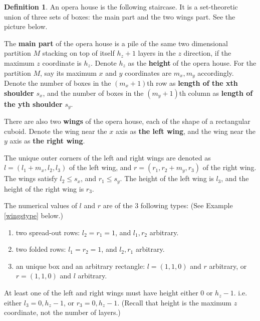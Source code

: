 \documentclass{amsart}[10pt]
\theoremstyle{plain}
\theoremstyle{definition}
\newtheorem{definition}[theorem]{Definition}
\begin{document}
\begin{definition}
\label{def_opera_house}
An opera house is the following staircase. It is a set-theoretic union of three sets of boxes: the main part and the two wings part. See the picture below.

The \textbf{main part} of the opera house is a pile of the same two dimensional partition $M$ stacking on top of itself $h_z+1$ layers in the $z$ direction, if the maximum $z$ coordinate is $h_z$. Denote $h_z$ as the \textbf{height} of the opera house. For the partition $M$, say its maximum $x$ and $y$ coordinates are $m_x, m_y$ accordingly. Denote the number of boxes in the $(m_x+1)$th row as \textbf{length of the  xth shoulder} $s_x$, and the number of boxes in the $(m_y+1)$th column as \textbf{length of the  yth shoulder} $s_y$.

There are also two \textbf{wings} of the opera house, each of the shape of a rectangular cuboid. Denote the wing near the $x$ axis as \textbf{the left wing}, and the wing near the $y$ axis as \textbf{the right wing}.

The unique outer corners of the left and right wings are denoted as $l=(l_1+ m_x ,l_2,l_3)$ of the left wing, and $r=(r_1,r_2+m_y,r_3)$ of the right wing. The wings satisfy $l_2 \leq s_x$, and $r_1 \leq s_y$. The height of the left wing is $l_3$, and the height of the right wing is $r_3$. 


The numerical values of $l$ and $r$ are of the $3$ following types: (See Example \ref{wingstype} below.)
\begin{enumerate}
\item two spread-out rows: $l_2=r_1=1$, and $l_1,r_2$ arbitrary.
\item two folded rows: $l_1=r_2=1$, and $l_2,r_1$ arbitrary.
\item an unique box and an arbitrary rectangle: $l=(1,1,0)$ and $r$ arbitrary, or $r=(1,1,0)$ and $l$ arbitrary.
\end{enumerate}
At least one of the left and right wings must have height either $0$ or $h_z-1$. i.e. either $l_3=0, h_z-1$, or $r_3=0,h_z-1$. (Recall that height is the maximum $z$ coordinate, not the number of layers.)


\end{definition}
\end{document}

